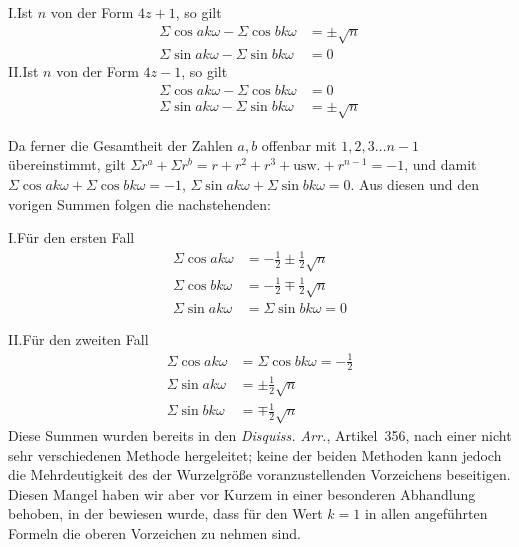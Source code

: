 \noindent I.\quad Ist $n$ von der Form $4z+1$, so gilt
\[
\begin{aligned}
\Sigma\cos ak\omega-\Sigma\cos bk\omega&=\pm\surd n\\
\Sigma\sin ak\omega-\Sigma\sin bk\omega&=0
\end{aligned}
\]
\noindent II.\quad Ist $n$ von der Form $4z-1$, so gilt
\[
\begin{aligned}
\Sigma\cos ak\omega-\Sigma\cos bk\omega&=0\\
\Sigma\sin ak\omega-\Sigma\sin bk\omega&=\pm\surd n
\end{aligned}
\]

Da ferner die Gesamtheit der Zahlen $a,b$ offenbar mit $1,2,3\dots n-1$ übereinstimmt, gilt $\Sigma r^a+\Sigma r^b=r+r^2+r^3+\text{usw.}+r^{n-1}=-1$, und damit $\Sigma\cos ak\omega+\Sigma\cos bk\omega=-1$, $\Sigma\sin ak\omega+\Sigma\sin bk\omega=0$. Aus diesen und den vorigen Summen folgen die nachstehenden:

\noindent I.\quad Für den ersten Fall
\[
\begin{aligned}
\Sigma\cos ak\omega&=-\tfrac12\pm\tfrac12\surd n\\
\Sigma\cos bk\omega&=-\tfrac12\mp\tfrac12\surd n\\
\Sigma\sin ak\omega&=\Sigma\sin bk\omega=0
\end{aligned}
\]

\noindent II.\quad Für den zweiten Fall
\[
\begin{aligned}
\Sigma\cos ak\omega&=\Sigma\cos bk\omega=-\tfrac12\\
\Sigma\sin ak\omega&=\pm\tfrac12\surd n\\
\Sigma\sin bk\omega&=\mp\tfrac12\surd n
\end{aligned}
\]
Diese Summen wurden bereits in den \emph{Disquiss. Arr.}, Artikel~356, nach einer nicht sehr verschiedenen Methode hergeleitet; keine der beiden Methoden kann jedoch die Mehrdeutigkeit des der Wurzelgröße voranzustellenden Vorzeichens beseitigen. Diesen Mangel haben wir aber vor Kurzem in einer besonderen Abhandlung behoben, in der bewiesen wurde, dass für den Wert $k=1$ in allen angeführten Formeln die oberen Vorzeichen zu nehmen sind.
